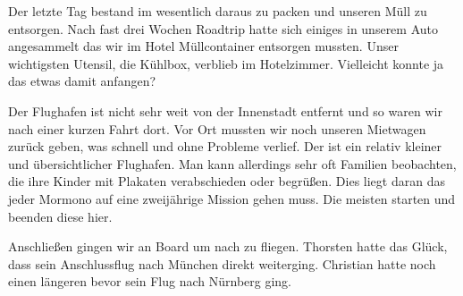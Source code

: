 Der letzte Tag bestand im wesentlich daraus zu packen und unseren Müll zu entsorgen.
Nach fast drei Wochen Roadtrip hatte sich einiges in unserem Auto angesammelt das wir im Hotel Müllcontainer entsorgen mussten.
Unser wichtigsten Utensil, die Kühlbox, verblieb im Hotelzimmer.
Vielleicht konnte ja das  etwas damit anfangen?

Der Flughafen ist nicht sehr weit von der Innenstadt entfernt und so waren wir nach einer kurzen Fahrt dort.
Vor Ort mussten wir noch unseren Mietwagen zurück geben, was schnell und ohne Probleme verlief.
Der  ist ein relativ kleiner und übersichtlicher Flughafen.
Man kann allerdings sehr oft Familien beobachten, die ihre Kinder mit Plakaten verabschieden oder begrüßen.
Dies liegt daran das jeder Mormono auf eine zweijährige Mission gehen muss. 
Die meisten starten und beenden diese hier.

Anschließen gingen wir an Board um nach  zu fliegen.
Thorsten hatte das Glück, dass sein Anschlussflug nach München direkt weiterging.
Christian hatte noch einen längeren  bevor sein Flug nach Nürnberg ging.
